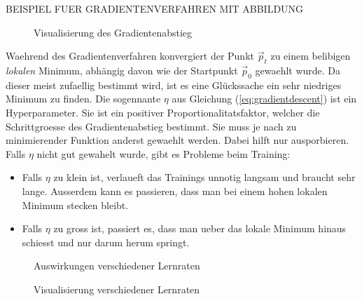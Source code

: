 BEISPIEL FUER GRADIENTENVERFAHREN MIT ABBILDUNG

\begin{figure}[h!]
  \centering

  \caption{Visualisierung des Gradientenabstieg}
\end{figure}

Waehrend des Gradientenverfahren konvergiert der Punkt $\vec{p}_t$ zu einem belibigen \textit{lokalen} Minimum, abhängig davon wie der Startpunkt $\vec{p}_0$ gewaehlt wurde.
Da dieser meist zufaellig bestimmt wird, ist es eine Glückssache ein sehr niedriges Minimum zu finden.
\para{}
Die sogennante  $\eta$ aus Gleichung (\ref{eq:gradientdescent}) ist ein Hyperparameter.
Sie ist ein positiver Proportionalitatsfaktor, welcher die Schrittgroesse des Gradientenabstieg bestimmt. Sie muss je nach zu minimierender Funktion anderst gewaehlt werden.
Dabei hilft nur ausporbieren. Falls $\eta$ nicht gut gewahelt wurde, gibt es Probleme beim Training:
\begin{itemize}
\item{Falls $\eta$ zu klein ist, verlaueft das Trainings unnotig langsam und braucht sehr lange.
    Ausserdem kann es passieren, dass man bei einem hohen lokalen Minimum stecken bleibt.}

\item{Falls $\eta$ zu gross ist, passiert es, dass man ueber das lokale Minimum hinaus schiesst und nur darum herum springt.}
\end{itemize}

\begin{figure}[h!]
  \centering
  \caption{Auswirkungen verschiedener Lernraten}
\end{figure}

\begin{figure}[h!]
  \centering
  \caption{Visualisierung verschiedener Lernraten}
\end{figure}


